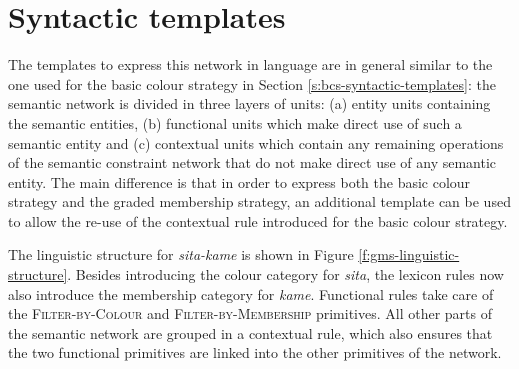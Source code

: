 \section{Syntactic templates}
\label{s:gms-syntactic-templates}

The templates to express this network in language are in general
similar to the one used for the basic colour strategy in
Section \ref{s:bcs-syntactic-templates}: the semantic network is
divided in three layers of units: (a) entity units containing the
semantic entities, (b) functional units which make direct use of such
a semantic entity and (c) contextual units which contain any remaining
operations of the semantic constraint network that do not make direct
use of any semantic entity. The main difference is that in order to
express both the basic colour strategy and the graded
  membership strategy, an additional template can be used to allow
the re-use of the contextual rule introduced for the basic colour
strategy.

The linguistic structure for \textit{sita-kame} is shown in Figure
\ref{f:gms-linguistic-structure}. Besides introducing the colour
category for \textit{sita}, the lexicon rules now also introduce the
membership category for \textit{kame}. Functional rules take care of the
\textsc{Filter-by-Colour} and \textsc{Filter-by-Membership}
primitives. All other parts of the semantic network are grouped in a
contextual rule, which also ensures that the two functional primitives are
linked into the other primitives of the network.

